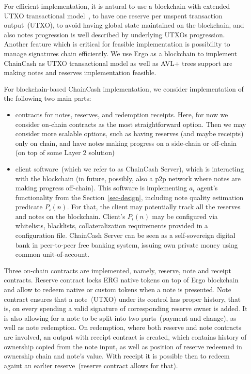 \documentclass{llncs}   %
\newcommand{\cc}{ChainCash}
\begin{document}
For efficient implementation, it is natural to use a blockchain with extended UTXO transactional model~\cite{chakravarty2020extended}, to have one reserve per unspent transaction output~(UTXO), to
avoid having global state maintained on the blockchain, and also notes progression is well described by underlying UTXOs progression. Another feature which is critical for feasible implementation is
possibility to manage signatures chain efficiently. We use Ergo as a blockchain to implement \cc{} as UTXO transactional model as well as AVL+ trees support are making notes and reserves implementation feasible.

For blockchain-based \cc{} implementation, we consider implementation of the following two main parts:

\begin{itemize}
  \item{} contracts for notes, reserves, and redemption receipts. Here, for now we consider on-chain contracts as the most
  straightforward option. Then we may consider more scalable options, such as having reserves (and maybe receipts) only
  on chain, and have notes making progress on a side-chain or off-chain (on top of some Layer 2 solution)
  \item{} client software~(which we refer to as \cc{} Server), which is interacting with the blockchain (in future, possibly, also a p2p network
  where notes are making progress off-chain). This software is implementing $a_i$ agent's functionality from the Section~\ref{sec-design},
  including note quality estimation predicate $P_i(n)$. For that, the client may potentially track all the reserves and notes on the blockchain.
  Client's $P_i(n)$ may be configured via whitelists, blacklists, collateralization requirements provided in a configuration file.
  \cc{} Server can be seen as a self-sovereign digital bank in peer-to-peer free banking system, issuing own private money using common unit-of-account.
\end{itemize}

Three on-chain contracts are implemented, namely, reserve, note and receipt contracts. Reserve contract locks ERG native tokens on top of Ergo blockchain and allow to redeem native or custom tokens when a note is presented. Note contract ensures that a note~(UTXO) under its control has proper history, that is, on every spending a valid signature of corresponding reserve owner is added. It is also allowing for a note to be split into two parts~(payment and change), as well as note redemption.
On redemption, where both reserve and note contracts are involved, an output with receipt contract is created, which contains history of ownership copied from the note input, as well as position of reserve redeemed in ownership chain and note's value. With receipt it is possible then to redeem againt an earlier reserve~(reserve contract allows for that).
\end{document}
